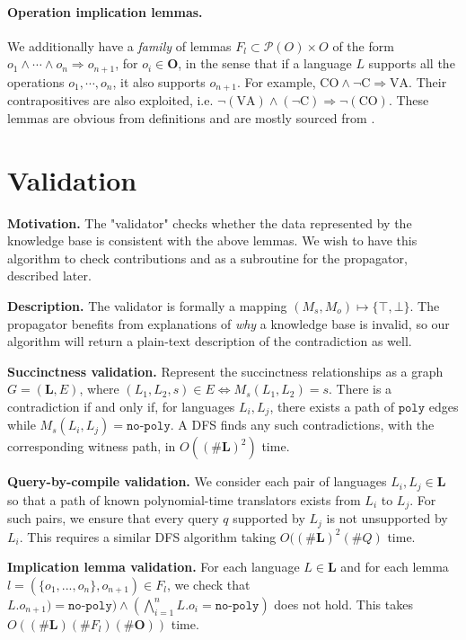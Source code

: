 \documentclass[10pt]{article}
\theoremstyle{plain}
\theoremstyle{definition}
\theoremstyle{remark}
\begin{document}
\paragraph{Operation implication lemmas.}
We additionally have a \emph{family} of lemmas $F_l \subset \mathcal{P}(O) \times O$ of the form $o_1 \wedge \cdots \wedge o_n \Rightarrow o_{n+1}$, for $o_i\in \textbf{O}$, in the sense that if a language $L$ supports all the operations $o_1, \cdots, o_n$, it also supports $o_{n+1}$. For example, $\text{CO} \wedge \lnot\text{C} \Rightarrow \text{VA}$. Their contrapositives are also exploited, i.e. $\neg(\text{VA}) \wedge (\neg \text{C}) \Rightarrow \neg(\text{CO})$. These lemmas are obvious from definitions and are mostly sourced from \citep{Darwiche_2002}.

\section{Validation}

\textbf{Motivation.} The "validator" checks whether the data represented by the knowledge base is consistent with the above lemmas. We wish to have this algorithm to check contributions and as a subroutine for the propagator, described later.

\textbf{Description.} The validator is formally a mapping $(M_s, M_o) \mapsto \{\top, \bot\}$. The propagator benefits from explanations of \emph{why} a knowledge base is invalid, so our algorithm will return a plain-text description of the contradiction as well.


\textbf{Succinctness validation.} Represent the succinctness relationships as a graph $G = (\textbf{L}, E)$, where $(L_1, L_2, s) \in E \iff M_s(L_1, L_2) = s$. There is a contradiction if and only if, for languages $L_i, L_j$, there exists a path of $\texttt{poly}$ edges while $M_s(L_i, L_j) = \texttt{no-poly}$. A DFS finds any such contradictions, with the corresponding witness path, in $O((\#\textbf{L})^2)$ time.

\textbf{Query-by-compile validation.} We consider each pair of languages $L_i, L_j \in \textbf{L}$ so that a path of known polynomial-time translators exists from $L_i$ to $L_j$. For such pairs, we ensure that every query $q$ supported by $L_j$ is not unsupported by $L_i$. This requires a similar DFS algorithm taking $O((\#\textbf{L})^2(\#Q)$ time.

\textbf{Implication lemma validation.} For each language $L \in \textbf{L}$ and for each lemma $l=(\{o_1, ..., o_n\}, o_{n+1}) \in F_l$, we check that $L.o_{n+1})=\texttt{no-poly}) \wedge (\bigwedge_{i=1}^n  L.o_i=\texttt{no-poly})$ does not hold. This takes $O((\#\textbf{L})(\#F_l)(\#\textbf{O}))$ time.
\end{document}
